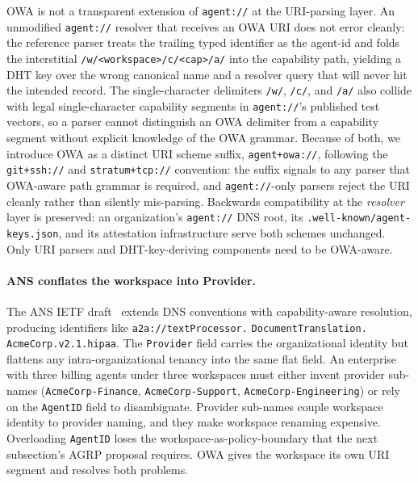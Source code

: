OWA is not a transparent extension of \texttt{agent://} at
the URI-parsing layer. An unmodified \texttt{agent://}
resolver that receives an OWA URI does not error cleanly:
the reference parser treats the trailing typed identifier
as the agent-id and folds the interstitial
\texttt{/w/<workspace>/c/<cap>/a/} into the capability
path, yielding a DHT key over the wrong canonical name and
a resolver query that will never hit the intended record.
The single-character delimiters \texttt{/w/}, \texttt{/c/},
and \texttt{/a/} also collide with legal single-character
capability segments in
\texttt{agent://}'s published test vectors, so a parser
cannot distinguish an OWA delimiter from a capability
segment without explicit knowledge of the OWA grammar.
Because of both, we introduce OWA as a distinct URI scheme
suffix, \texttt{agent+owa://}, following the
\texttt{git+ssh://} and \texttt{stratum+tcp://} convention:
the suffix signals to any parser that OWA-aware path
grammar is required, and \texttt{agent://}-only parsers
reject the URI cleanly rather than silently mis-parsing.
Backwards compatibility at the \emph{resolver} layer is
preserved: an organization's \texttt{agent://} DNS root,
its \texttt{.well-known/agent-keys.json}, and its
attestation infrastructure serve both schemes unchanged.
Only URI parsers and DHT-key-deriving components need to
be OWA-aware.

\paragraph{ANS conflates the workspace into Provider.}
The ANS IETF draft~\cite{ans_ietf} extends DNS conventions
with capability-aware resolution, producing identifiers
like \texttt{a2a://textProcessor.}\allowbreak
\texttt{DocumentTranslation.}\allowbreak
\texttt{AcmeCorp.v2.1.hipaa}.
The \texttt{Provider} field carries the organizational
identity but flattens any intra-organizational tenancy
into the same flat field. An enterprise with three billing
agents under three workspaces must either invent provider
sub-names (\texttt{AcmeCorp-Finance},
\texttt{AcmeCorp-Support}, \texttt{AcmeCorp-Engineering})
or rely on the \texttt{AgentID} field to disambiguate.
Provider sub-names couple workspace identity to provider
naming, and they make workspace renaming expensive.
Overloading \texttt{AgentID} loses the
workspace-as-policy-boundary that the next subsection's
AGRP proposal requires. OWA gives the workspace its own
URI segment and resolves both problems.

